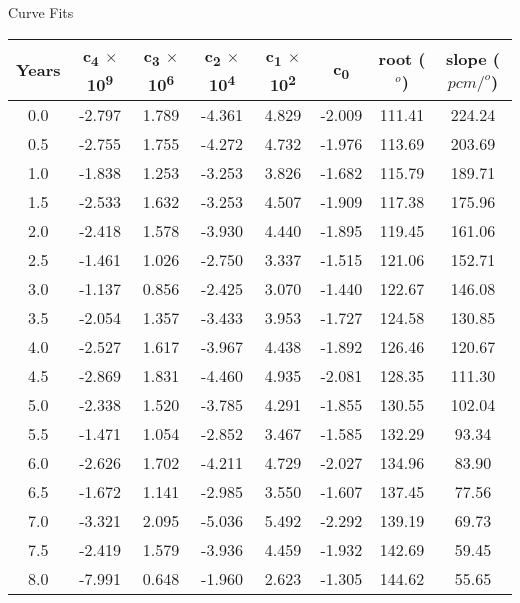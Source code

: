 \documentclass[aspectratio=169,pdftex,dvipsnames]{beamer}
\newcommand{\sci}[1][]{$\times$ 10\textsuperscript{#1} }
\begin{document}
\begin{frame}{Curve Fits}
    \begin{table}[bh!]
        \centering\footnotesize
        \begin{tabular}{c|ccccc|cc}
        \hline
        Years & c\textsubscript{4} \sci[9] & c\textsubscript{3} \sci[6] & c\textsubscript{2} \sci[4] & c\textsubscript{1} \sci[2] & c\textsubscript{0} & root ($^o$) & slope ($pcm/^o$) \\ \hline
        0.0 & -2.797 & 1.789 & -4.361 & 4.829 & -2.009 & 111.41 & 224.24 \\
        0.5 & -2.755 & 1.755 & -4.272 & 4.732 & -1.976 & 113.69 & 203.69 \\
        1.0 & -1.838 & 1.253 & -3.253 & 3.826 & -1.682 & 115.79 & 189.71 \\
        1.5 & -2.533 & 1.632 & -3.253 & 4.507 & -1.909 & 117.38 & 175.96 \\
        2.0 & -2.418 & 1.578 & -3.930 & 4.440 & -1.895 & 119.45 & 161.06 \\\hline
        2.5 & -1.461 & 1.026 & -2.750 & 3.337 & -1.515 & 121.06 & 152.71 \\
        3.0 & -1.137 & 0.856 & -2.425 & 3.070 & -1.440 & 122.67 & 146.08 \\
        3.5 & -2.054 & 1.357 & -3.433 & 3.953 & -1.727 & 124.58 & 130.85 \\
        4.0 & -2.527 & 1.617 & -3.967 & 4.438 & -1.892 & 126.46 & 120.67 \\\hline
        4.5 & -2.869 & 1.831 & -4.460 & 4.935 & -2.081 & 128.35 & 111.30 \\
        5.0 & -2.338 & 1.520 & -3.785 & 4.291 & -1.855 & 130.55 & 102.04 \\
        5.5 & -1.471 & 1.054 & -2.852 & 3.467 & -1.585 & 132.29 & 93.34 \\
        6.0 & -2.626 & 1.702 & -4.211 & 4.729 & -2.027 & 134.96 & 83.90 \\\hline
        6.5 & -1.672 & 1.141 & -2.985 & 3.550 & -1.607 & 137.45 & 77.56 \\
        7.0 & -3.321 & 2.095 & -5.036 & 5.492 & -2.292 & 139.19 & 69.73 \\
        7.5 & -2.419 & 1.579 & -3.936 & 4.459 & -1.932 & 142.69 & 59.45 \\
        8.0 & -7.991 & 0.648 & -1.960 & 2.623 & -1.305 & 144.62 & 55.65 \\
        \end{tabular}
        \label{tab:Depletionfit}
    \end{table}
\end{frame}
\end{document}
